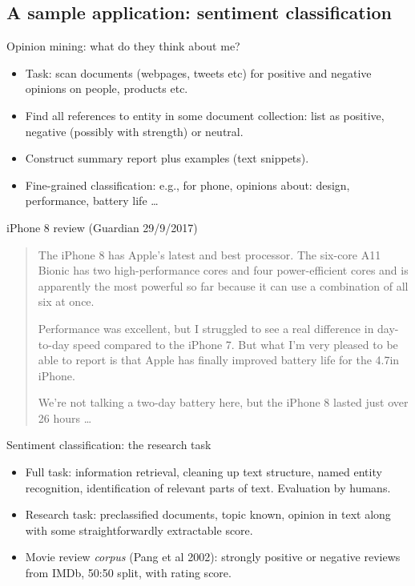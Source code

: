 \documentclass[compress]{beamer}
\begin{document}
\subsection{A sample application: sentiment classification}

\begin{frame}{Opinion mining: what do they think about me?}
  \begin{itemize}
  \item Task: scan documents (webpages, tweets etc) for positive and
    negative opinions on people, products etc.
  \item Find all references to entity in some document collection:
    list as positive, negative (possibly with strength) or neutral.
  \item Construct summary report plus examples (text snippets).
  \item Fine-grained classification: e.g., for phone, opinions about:
    design, performance, battery life \ldots
\end{itemize}
\end{frame}

\begin{frame}{iPhone 8 review (Guardian 29/9/2017)}
  \begin{quote} 
    The iPhone 8 has Apple's latest and best processor. The six-core
    A11 Bionic has two high-performance cores and four power-efficient
    cores and is apparently the most powerful so far because it can
    use a combination of all six at once.

    Performance was excellent, but I struggled to see a real
    difference in day-to-day speed compared to the iPhone 7. But what
    I'm very pleased to be able to report is that Apple has finally
    improved battery life for the 4.7in iPhone.

    We're not talking a two-day battery here, but the iPhone 8 lasted
    just over 26 hours \ldots
\end{quote}
\end{frame}

\begin{frame}{Sentiment classification: the research task}
  \begin{itemize}
  \item Full task: information retrieval, cleaning up text structure,
    named entity recognition, identification of relevant parts of
    text. Evaluation by humans.
  \item Research task: preclassified documents, topic known, opinion
    in text along with some straightforwardly extractable score.
  \item Movie review \emph{corpus} (Pang et al 2002): strongly
    positive or negative reviews from IMDb, 50:50 split, with rating
    score.
\end{itemize}
\end{frame}
\end{document}
